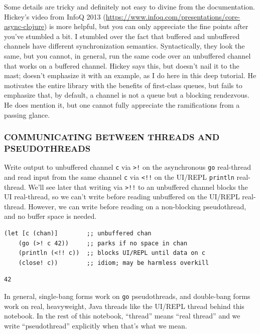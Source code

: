 \documentclass[10pt,oneside,x11names]{article}
\begin{document}
Some details are tricky and definitely not easy to divine from the
documentation. Hickey's video from InfoQ 2013
(\url{https://www.infoq.com/presentations/core-async-clojure}) is more
helpful, but you can only appreciate the fine points after you've
stumbled a bit. I stumbled over the fact that buffered and unbuffered
channels have different synchronization semantics. Syntactically, they
look the same, but you cannot, in general, run the same code over an
unbuffered channel that works on a buffered channel. Hickey says this,
but doesn't nail it to the mast; doesn't emphasize it with an example,
as I do here in this deep tutorial. He motivates the entire library with
the benefits of first-class queues, but fails to emphasize that, by
default, a channel is not a queue but a blocking rendezvous. He does
mention it, but one cannot fully appreciate the ramifications from a
passing glance.

\subsubsection{COMMUNICATING BETWEEN THREADS AND PSEUDOTHREADS}
\label{communicating-between-threads-and-pseudothreads}
Write output to unbuffered channel \texttt{c} via \texttt{>!} on the asynchronous \texttt{go}
real-thread and read input from the same channel \texttt{c} via \texttt{<!!} on the
UI/REPL \texttt{println} real-thread. We'll see later that writing via \texttt{>!!} to
an unbuffered channel blocks the UI real-thread, so we can't write
before reading unbuffered on the UI/REPL real-thread. However, we can
write before reading on a non-blocking pseudothread, and no buffer space
is needed.

\begin{verbatim}
(let [c (chan)]        ;; unbuffered chan
    (go (>! c 42))     ;; parks if no space in chan
    (println (<!! c))  ;; blocks UI/REPL until data on c
    (close! c))        ;; idiom; may be harmless overkill
\end{verbatim}

\begin{verbatim}
42
\end{verbatim}


In general, single-bang forms work on \texttt{go} pseudothreads, and
double-bang forms work on real, heavyweight, Java threads like the
UI/REPL thread behind this notebook. In the rest of this notebook,
``thread'' means ``real thread'' and we write ``pseudothread'' explicitly when
that's what we mean.
\end{document}
